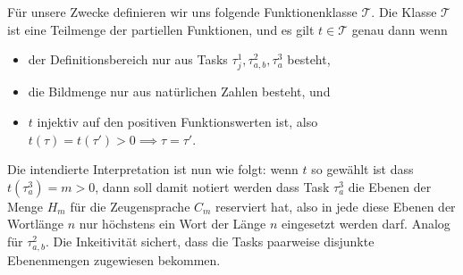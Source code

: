 Für unsere Zwecke definieren wir uns folgende Funktionenklasse $\mathcal T$. Die Klasse $\mathcal T$ ist eine Teilmenge der partiellen Funktionen, und es gilt $t\in\mathcal T$ genau dann wenn 
\begin{itemize}[nosep]
    \item der Definitionsbereich nur aus Tasks $\tau^1_j, \tau^2_{a,b}, \tau^3_a$ besteht, 
    \item die Bildmenge nur aus natürlichen Zahlen besteht, und
    \item $t$ injektiv auf den positiven Funktionswerten ist, also $t(\tau)=t(\tau')>0 \implies \tau=\tau'$.
\end{itemize}
Die intendierte Interpretation ist nun wie folgt: wenn $t$ so gewählt ist dass $t(\tau^3_a)=m>0$, dann soll damit notiert werden dass Task $\tau^3_a$ die Ebenen der Menge $H_m$ für die Zeugensprache $C_m$ reserviert hat, also in jede diese Ebenen der Wortlänge $n$ nur höchstens ein Wort der Länge $n$ eingesetzt werden darf. Analog für $\tau^2_{a,b}$.
Die Inkeitivität sichert, dass die Tasks paarweise disjunkte Ebenenmengen zugewiesen bekommen.


